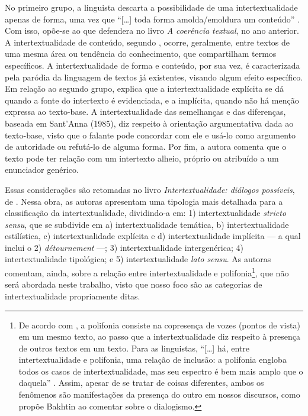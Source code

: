 \documentclass{textolivre}
\begin{document}
No primeiro grupo, a linguista descarta a possibilidade de uma intertextualidade apenas de forma, uma vez que “[…] toda forma amolda/emoldura um conteúdo” \cite[p. 532]{koch__1991}. Com isso, opõe-se ao que defendera no livro \textit{A coerência textual}, no ano anterior. A intertextualidade de conteúdo, segundo \textcite{koch__1991}, ocorre, geralmente, entre textos de uma mesma área ou tendência do conhecimento, que compartilham termos específicos. A intertextualidade de forma e conteúdo, por sua vez, é caracterizada pela paródia da linguagem de textos já existentes, visando algum efeito específico. Em relação ao segundo grupo, \textcite{koch__1991} explica que a intertextualidade explícita se dá quando a fonte do intertexto é evidenciada, e a implícita, quando não há menção expressa ao texto-base. A intertextualidade das semelhanças e das diferenças, baseada em Sant’Anna (1985), diz respeito à orientação argumentativa dada ao texto-base, visto que o falante pode concordar com ele e usá-lo como argumento de autoridade ou refutá-lo de alguma forma. Por fim, a autora comenta que o texto pode ter relação com um intertexto alheio, próprio ou atribuído a um enunciador genérico.

Essas considerações são retomadas no livro \textit{Intertextualidade: diálogos possíveis}, de \textcite{koch_intertextualidade:_2012}. Nessa obra, as autoras apresentam uma tipologia mais detalhada para a classificação da intertextualidade, dividindo-a em: 1) intertextualidade \textit{stricto sensu}, que se subdivide em a) intertextualidade temática, b) intertextualidade estilística, c) intertextualidade explícita e d) intertextualidade implícita — a qual inclui o 2) \textit{détournement} —; 3) intertextualidade intergenérica; 4) intertextualidade tipológica; e 5) intertextualidade \textit{lato sensu}. As autoras comentam, ainda, sobre a relação entre intertextualidade e polifonia\footnote{De acordo com \textcite{koch_intertextualidade:_2012}, a polifonia consiste na copresença de vozes (pontos de vista) em um mesmo texto, ao passo que a intertextualidade diz respeito à presença de outros textos em um texto. Para as linguistas, “[…] há, entre intertextualidade e polifonia, uma relação de inclusão: a polifonia engloba todos os casos de intertextualidade, mas seu espectro é bem mais amplo que o daquela” \cite[p. 83]{koch_intertextualidade:_2012}. Assim, apesar de se tratar de coisas diferentes, ambos os fenômenos são manifestações da presença do outro em nossos discursos, como propõe Bakhtin ao comentar sobre o dialogismo.}, que não será abordada neste trabalho, visto que nosso foco são as categorias de intertextualidade propriamente ditas.
\end{document}
